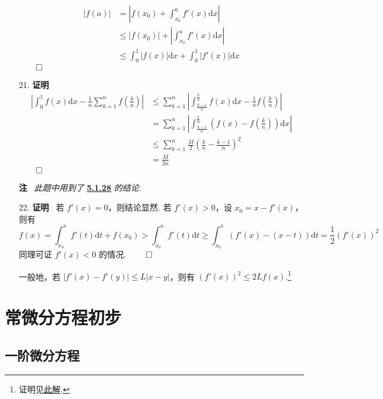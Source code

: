 \documentclass[11pt,oneside,fontset=fandol]{ctexbook} %
\begin{document}
\begin{enumerate}
    \begin{align*}
        |f(a)| &= \left| f(x_0) + \int_{x_0}^a f'(x) \mathrm dx \right| \\
        &\leqslant |f(x_0)| + \left| \int_{x_0}^a f'(x) \mathrm dx \right| \\
        &\leqslant \int_0^1 |f(x)| \mathrm dx + \int_0^1 |f'(x)| \mathrm dx
    \end{align*}
    $\hfill\qed$
    \item[21.]
    \textbf{证明}
    \begin{align*}
        \left| \int_0^1 f(x) \mathrm dx - \frac 1 n \sum_{k=1}^n f\left( \frac k n \right) \right| &\leqslant \sum_{k=1}^n \left| \int_{\frac {k-1} n}^{\frac k n} f(x) \mathrm dx - \frac 1 n f\left( \frac k n \right) \right| \\
        &= \sum_{k=1}^n \left| \int_{\frac {k-1} n}^{\frac k n} \left( f(x) - f\left( \frac k n \right) \right) \mathrm dx \right| \\
        &\leqslant \sum_{k=1}^n \frac M 2 (\frac k n - \frac {k-1} n)^2 \\
        &= \frac M {2n}
    \end{align*}
    $\hfill\qed$

    \textbf{注} \ \textit{此题中用到了} \hyperref[item:28]{\textbf{5.1.28}} \textit{的结论}.
    \item[22.]
    \textbf{证明} \ 若 $f'(x) = 0$，则结论显然. 若 $f'(x) > 0$，设 $x_0 = x - f'(x)$，则有
    \[
        f(x) = \int_{x_0}^x f'(t) \mathrm dt + f(x_0) > \int_{x_0}^x f'(t) \mathrm dt \geqslant \int_{x_0}^x (f'(x) - (x-t)) \mathrm dt = \frac 1 2 (f'(x))^2
    \]
    同理可证 $f'(x) < 0$ 的情况.
    $\hfill\qed$

    一般地，若 $|f'(x) - f'(y)| \leqslant L|x-y|$，则有 $(f'(x))^2 \leqslant 2L f(x)$.\footnote{证明见\href{https://www.zhihu.com/question/611041671/answer/3109739799}{此解}.}
\end{enumerate}

\newpage
\chapter{常微分方程初步}

\section{一阶微分方程}
\end{document}
